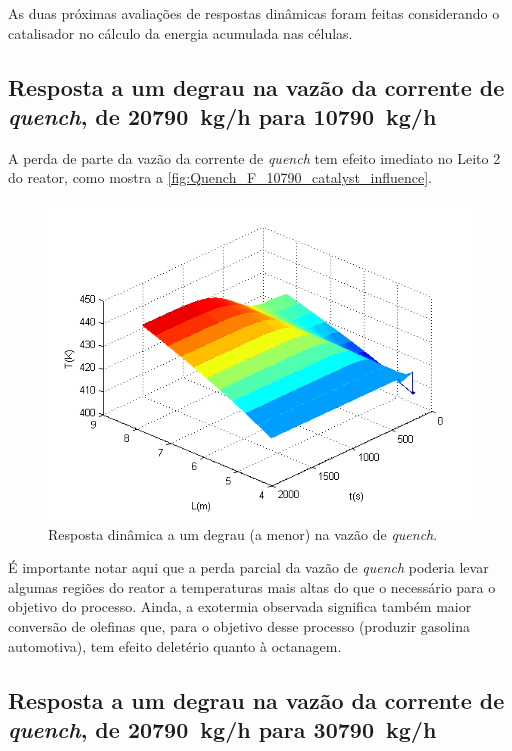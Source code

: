 As duas próximas avaliações de respostas dinâmicas foram feitas considerando o
catalisador no cálculo da energia acumulada nas células.

\subsection{Resposta a um degrau na vazão da corrente de \emph{quench}, de
\SI{20790}{kg/h} para \SI{10790}{kg/h}}
\label{sec:respostaaumdegrauvazao1}

A perda de parte da vazão da corrente de \emph{quench} tem efeito imediato no
Leito 2 do reator, como mostra a \autoref{fig:Quench_F_10790_catalyst_influence}.

\begin{figure}[htb]
\centering
\includegraphics[scale=0.8]{images/Chap4/Quench_F_10790_catalyst_influence.png}
\caption{Resposta dinâmica a um degrau (a menor) na vazão de \emph{quench}.}
\label{fig:Quench_F_10790_catalyst_influence}
\end{figure}

É importante notar aqui que a perda parcial da vazão de \emph{quench} poderia
levar algumas regiões do reator a temperaturas mais altas do que o
necessário para o objetivo do processo. Ainda, a exotermia
observada significa também maior conversão de olefinas que, para o objetivo
desse processo (produzir gasolina automotiva), tem efeito deletério quanto à
octanagem.

\subsection{Resposta a um degrau na vazão da corrente de \emph{quench}, de
\SI{20790}{kg/h} para \SI{30790}{kg/h}} \label{sec:respostaaumdegrauvazao3}

